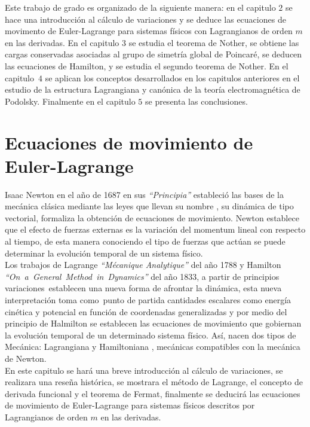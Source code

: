 \documentclass[a4paper,12pt]{article}
\begin{document}
Este trabajo de grado es organizado de la siguiente manera: en el capitulo $2$ se hace una introducción al cálculo de variaciones y se deduce las ecuaciones de movimento de Euler-Lagrange para sistemas físicos con Lagrangianos de orden $m$ en las derivadas. En el capitulo $3$ se estudia el teorema de Nother, se obtiene las cargas conservadas asociadas al grupo de simetría global de Poincaré, se deducen las ecuaciones de Hamilton, y se estudia el segundo teorema de Nother. En el \mbox{capitulo $4$} se aplican los conceptos desarrollados en los capitulos anteriores en el estudio de la estructura Lagrangiana y canónica de la teoría electromagnética de Podolsky. Finalmente en el capitulo $5$ se presenta las conclusiones. 
\newpage
\section{Ecuaciones de movimiento de Euler-Lagrange}
Isaac Newton en el año de 1687 en sus \textit{``Principia''} estableció las bases de la mecánica clásica  mediante las leyes que llevan su nombre \cite{newton}, su dinámica de tipo vectorial, formaliza la obtención de ecuaciones de movimiento. Newton establece que el efecto de fuerzas externas es la variación del momentum lineal con respecto al tiempo, de esta manera conociendo el tipo de fuerzas que actúan se puede determinar la evolución temporal de un sistema físico.
\\

Los trabajos de Lagrange \textit{``Mécanique Analytique''} del año 1788 y \mbox{Hamilton} \textit{\mbox{``On a General
Method in Dynamics''}} del año 1833, a partir de principios \mbox{variaciones establecen} una nueva forma de afrontar la dinámica, esta nueva \mbox{interpretación} toma \mbox{como punto} de partida cantidades escalares como energía cinética y \mbox{potencial} en \mbox{función} de coordenadas generalizadas y por medio del principio de \mbox{Halmilton} se establecen las ecuaciones de movimiento que gobiernan la evolución temporal de un determinado sistema físico. Así, nacen dos tipos de Mecánica: Lagrangiana y Hamiltoniana \cite{hamilton}, mecánicas compatibles con la mecánica de Newton.
\\

En este capitulo se hará una breve introducción al cálculo de variaciones, se realizara una reseña histórica, se mostrara el método de Lagrange, el concepto de derivada funcional y el teorema de Fermat, finalmente se deducirá las ecuaciones de movimiento de Euler-Lagrange para sistemas físicos descritos por Lagrangianos de orden $m$ en las derivadas.
\end{document}
